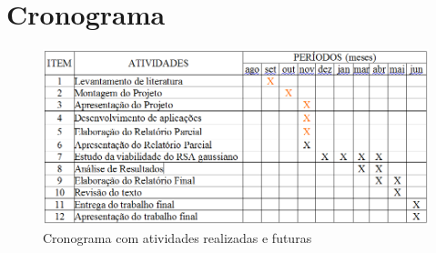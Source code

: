 \chapter{Cronograma}
\label{Cap5}

\begin{figure}[!htb]
	\centering
		\includegraphics[scale=0.5]{figuras/cronograma.PNG}
	\caption{Cronograma com atividades realizadas e futuras}
	\label{fig:cronograma}
\end{figure}
